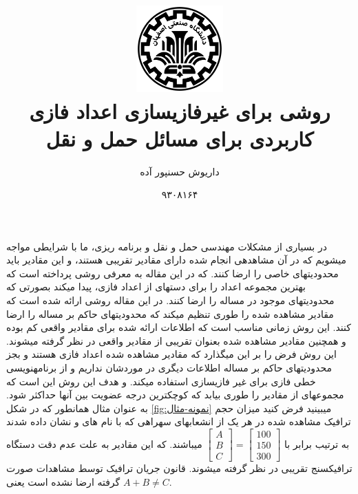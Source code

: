\documentclass[10pt,a4paper]{article}
\newcommand{\نیمفاصله}{\halfspace}
\renewcommand{\ }{\halfspace}
\newcommand{\؛}{،}
\begin{document}
\title{
    \includegraphics[width=0.25\textwidth]{iut}\\\vspace{30pt}
    روشی برای غیرفازی\ سازی اعداد فازی\\کاربردی برای مسائل حمل و نقل    
}
\author{داریوش حسن\ پور آده}
\date{۹۳۰۸۱۶۴}
\maketitle
\null
\vfill
\newpage
در بسیاری از مشکلات مهندسی حمل و نقل و برنامه ریزی، ما با شرایطی مواجه می\ شویم که در آن مشاهده\ ی انجام شده دارای مقادیر تقریبی هستند، و این مقادیر باید محدودیت\ های خاصی را ارضا کنند. که در این مقاله\
\cite{THEPAPER}
به معرفی روشی پرداخته است که بهترین مجموعه اعداد را برای دسته\ ای از اعداد فازی\؛ پیدا می\ کند بصورتی که محدودیت\ های موجود در مساله را ارضا کنند.
در این مقاله روشی ارائه شده است که مقادیر مشاهده شده را طوری تنظیم می\ کند که محدودیت\ های حاکم بر مساله را ارضا کنند. این روش زمانی مناسب است که اطلاعات ارائه شده برای مقادیر واقعی کم بوده و همچنین مقادیر مشاهده شده بعنوان تقریبی از مقادیر واقعی در نظر گرفته می\ شوند. این روش فرض را بر این می\ گذارد که مقادیر مشاهده شده اعداد فازی هستند و بجز محدودیت\ های حاکم بر مساله اطلاعات دیگری در موردشان نداریم و از برنامه\ نویسی خطی فازی برای غیر فازی\ سازی استفاده می\ کند. و هدف این روش این است که مجموعه\ ای از مقادیر را طوری بیابد که کوچکترین درجه عضویت بین آنها حداکثر شود.
به عنوان مثال همان\ طور که در شکل
\ref{fig:نمونه-مثال}
می\ بینید فرض کنید میزان حجم ترافیک مشاهده شده در هر یک از انشعاب\ های سه\ راهی که با نام های
\lr{A, B} و \lr{C}
نشان داده شدند به ترتیب برابر با
$\begin{bmatrix}
A\\B\\C
\end{bmatrix} = \begin{bmatrix}
100\\150\\300
\end{bmatrix}$
می\ باشند. که این مقادیر به علت عدم دقت دستگاه ترافیک\ سنج تقریبی در نظر گرفته می\ شوند. قانون جریان ترافیک توسط مشاهدات صورت گرفته ارضا نشده است یعنی
$A + B \neq C$.
\end{document}
